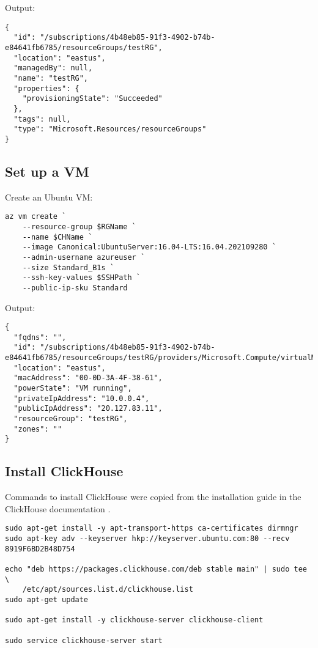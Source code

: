 Output:

\begin{verbatim}
{
  "id": "/subscriptions/4b48eb85-91f3-4902-b74b-e84641fb6785/resourceGroups/testRG",
  "location": "eastus",
  "managedBy": null,
  "name": "testRG",
  "properties": {
    "provisioningState": "Succeeded"
  },
  "tags": null,
  "type": "Microsoft.Resources/resourceGroups"
}
\end{verbatim}
\subsection{Set up a VM}
\label{sec:orgccb5fe2}
Create an Ubuntu VM:
\begin{verbatim}
az vm create `
    --resource-group $RGName `
    --name $CHName `
    --image Canonical:UbuntuServer:16.04-LTS:16.04.202109280 `
    --admin-username azureuser `
    --size Standard_B1s `
    --ssh-key-values $SSHPath `
    --public-ip-sku Standard
\end{verbatim}

Output:
\begin{verbatim}
{
  "fqdns": "",
  "id": "/subscriptions/4b48eb85-91f3-4902-b74b-e84641fb6785/resourceGroups/testRG/providers/Microsoft.Compute/virtualMachines/clickhouseVM",
  "location": "eastus",
  "macAddress": "00-0D-3A-4F-38-61",
  "powerState": "VM running",
  "privateIpAddress": "10.0.0.4",
  "publicIpAddress": "20.127.83.11",
  "resourceGroup": "testRG",
  "zones": ""
}
\end{verbatim}

\subsection{Install ClickHouse}
\label{sec:org2265ef7}
Commands to install ClickHouse were copied from the installation guide in the ClickHouse documentation 
\cite{noauthor_installation_nodate}.

\begin{verbatim}
sudo apt-get install -y apt-transport-https ca-certificates dirmngr
sudo apt-key adv --keyserver hkp://keyserver.ubuntu.com:80 --recv 8919F6BD2B48D754

echo "deb https://packages.clickhouse.com/deb stable main" | sudo tee \
    /etc/apt/sources.list.d/clickhouse.list
sudo apt-get update

sudo apt-get install -y clickhouse-server clickhouse-client

sudo service clickhouse-server start
\end{verbatim}

